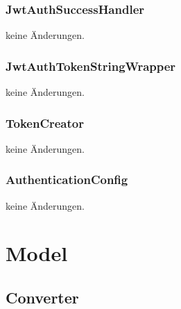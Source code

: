 \documentclass[a4paper,20pt,oneside]{book}
\begin{document}
	\subsubsection{JwtAuthSuccessHandler}
	keine Änderungen.
	
	\subsubsection{JwtAuthTokenStringWrapper}
	keine Änderungen.
	
	\subsubsection{TokenCreator}
	keine Änderungen.

	\subsubsection{AuthenticationConfig}
	keine Änderungen.


		
	\section{Model}
	\subsection{Converter}
\end{document}
